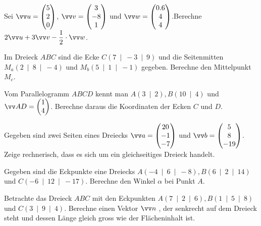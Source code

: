 \documentclass[11pt]{exam}
\begin{document}
\begin{questions}


\question[3] %
Sei $\v{u}=\Vec{5}{2}{0}$, $\v{v}=\Vec{3}{-8}{1}$ und $\v{w}=\Vec{0.6}{4}{4}$.\newline Berechne $\displaystyle2\v{u}+3\v{v}-\frac{1}{2}\*\v{w}$.


\question[3] %
Im Dreieck $ABC$ sind die Ecke $C\left(7\:\mid\:-3\:\mid\:9\right)$ und die Seitenmitten $M_a\left(2\:\mid\:8\:\mid\:-4\right)$ und $M_b\left(5\:\mid\:1\:\mid\:-1\right)$ gegeben. Berechne den Mittelpunkt $M_c$.


\question[4] %
Vom Parallelogramm $ABCD$ kennt man $A\left(3\:\mid\:2\right), B\left(10\:\mid\:4\right)$ und $\v{AD}=\vec{1}{4}$. Berechne daraus die Koordinaten der Ecken $C$ und $D$.


\question[4] %
Gegeben sind zwei Seiten eines Dreiecks $\v{a}=\Vec{20}{-1}{-7}$ und $\v{b}=\Vec{5}{8}{-19}$. Zeige rechnerisch, dass es sich um ein gleichseitiges Dreieck handelt.


\question[6] %
Gegeben sind die Eckpunkte eine Dreiecks $A\left(-4\:\mid\:6\:\mid\:-8\right), B\left(6\:\mid\:2\:\mid\:14\right)$ und $C\left(-6\:\mid\:12\:\mid\:-17\right)$. Berechne den Winkel $\alpha$ bei Punkt $A$.

\question[5] %
Betrachte das Dreieck $ABC$ mit den Eckpunkten $A\left(7\:\mid\:2\:\mid\:6\right), B\left(1\:\mid\:5\:\mid\:8\right)$ und $C\left(3\:\mid\:9\:\mid\:4\right)$. Berechne einen Vektor $\v{n}$ , der senkrecht auf dem Dreieck steht und dessen Länge gleich gross wie der Flächeninhalt ist.



\noaddpoints
\question[\totalpoints]
\addpoints
\begin{parts}

\end{parts}
\end{questions}
\end{document}
